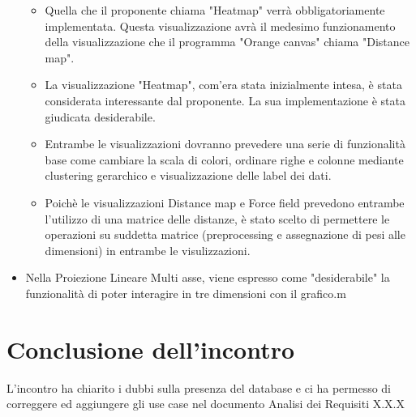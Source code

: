 \documentclass{article}
\begin{document}
\begin{itemize}
		\begin {itemize}
			\item Quella che il proponente chiama "Heatmap" verrà obbligatoriamente implementata. Questa visualizzazione avrà il medesimo funzionamento della visualizzazione che il programma "Orange canvas" chiama "Distance map".
			\item La visualizzazione "Heatmap", com'era stata inizialmente intesa, è stata considerata interessante dal proponente. La sua implementazione è stata giudicata desiderabile.
			\item Entrambe le visualizzazioni dovranno prevedere una serie di funzionalità base come cambiare la scala di colori, ordinare righe e colonne mediante clustering gerarchico e visualizzazione delle label dei dati.
			\item Poichè le visualizzazioni Distance map e Force field prevedono entrambe l'utilizzo di una matrice delle distanze, è stato scelto di permettere le operazioni su suddetta matrice (preprocessing e assegnazione di pesi alle dimensioni) in entrambe le visulizzazioni.
		\end {itemize}
		\item Nella Proiezione Lineare Multi asse, viene espresso come "desiderabile" la funzionalità di poter interagire in tre dimensioni con il grafico.m
	  \end{itemize}

\section{Conclusione dell'incontro}
\label{sec:conclusione}
L'incontro ha chiarito i dubbi sulla presenza del database e ci ha permesso di correggere ed aggiungere gli use case nel documento Analisi dei Requisiti X.X.X
\end{document}
